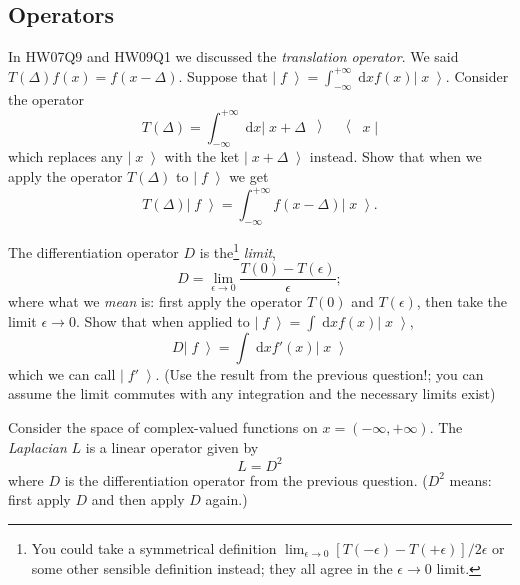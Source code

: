 \documentclass[answers]{exam}\newcommand{\repositoryInformationSetup}{     \usepackage[dvipsnames]{xcolor}     \usepackage[ angle=90, color=black, opacity=1, scale=2, ]{background}      \SetBgPosition{current page.west}      \SetBgVshift{-4.5mm}      \backgroundsetup{contents={{\color{green}\texttt{-{}-} differs from commit \texttt{aac605f} in 0 files}}} } \newcommand{\commit}{{{\color{green}aac605f}}}\usepackage{amsmath}
\newcommand{\goesto}{\ensuremath{\rightarrow}}
\providecommand{\id}{}
\renewcommand{\id}[1]{\ensuremath{\; \mathrm{d}#1}}
\newcommand{\ket}[1]{\ensuremath{\left|\;#1\;\right\rangle}}
\newcommand{\operator}[3]{\ensuremath{\left|\;#1\;\middle\rangle\; #2\; \middle\langle\;#3\;\right|}}
\begin{document}
\begin{questions}
	\section*{Operators}
	\question In HW07Q9 and HW09Q1 we discussed the \emph{translation operator}.  We said $T(\Delta) f(x) = f(x-\Delta)$.
	Suppose that $\ket{f} = \int_{-\infty}^{+\infty} \id{x} f(x) \ket{x}$.
	Consider the operator
	\begin{equation}
		T(\Delta) = \int_{-\infty}^{+\infty} \id{x} \operator{x+\Delta}{}{x}
	\end{equation}
	which replaces any \ket{x} with the ket $\ket{x+\Delta}$ instead.
	Show that when we apply the operator $T(\Delta)$ to \ket{f} we get
	\begin{equation}
		T(\Delta)\ket{f} = \int_{-\infty}^{+\infty} f(x-\Delta) \ket{x}.
	\end{equation}

	\begin{solution}\end{solution}

	\question The differentiation operator $D$ is the\footnote{You could take a symmetrical definition $\lim_{\epsilon\goesto0}[T(-\epsilon) - T(+\epsilon)]/2\epsilon$ or some other sensible definition instead; they all agree in the $\epsilon\goesto0$ limit.} \emph{limit},
	\begin{equation}
		D = \lim_{\epsilon\goesto0}\frac{T(0) - T(\epsilon)}{\epsilon};
	\end{equation}
	where what we \emph{mean} is: first apply the operator $T(0)$ and $T(\epsilon)$, then take the limit $\epsilon\goesto0$.
	Show that when applied to $\ket{f} = \int\id{x} f(x) \ket{x}$,
	\begin{equation}
		D\ket{f} = \int \id{x} f'(x) \ket{x}
	\end{equation}
	which we can call $\ket{f'}$.
	(Use the result from the previous question!; you can assume the limit commutes with any integration and the necessary limits exist)
	\begin{solution}\end{solution}
	\question Consider the space of complex-valued functions on $x=(-\infty,+\infty)$.
	The \emph{Laplacian} $L$ is a linear operator given by
	\begin{equation}
		L = D^2
	\end{equation}
	where $D$ is the differentiation operator from the previous question. ($D^2$ means: first apply $D$ and then apply $D$ again.)
	\begin{parts}

\end{parts}
\end{questions}
\end{document}
